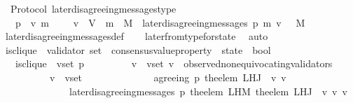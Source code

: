 \begin{isabellebody}
\isanewline
{}\isamarkupfalse%
\ {\isacharparenleft}\ Protocol{\isacharparenright}\ later{\isacharunderscore}disagreeing{\isacharunderscore}messages{\isacharunderscore}type\ {\isacharcolon}\isanewline
\ \ {\isachardoublequoteopen}{\isasymforall}\ p\ {\isasymsigma}\ v\ m{\isachardot}\ {\isasymsigma}\ {\isasymin}\ {\isasymSigma}\ {\isasymand}\ v\ {\isasymin}\ V\ {\isasymand}\ m\ {\isasymin}\ M\ {\isasymlongrightarrow}\ later{\isacharunderscore}disagreeing{\isacharunderscore}messages\ {\isacharparenleft}p{\isacharcomma}\ m{\isacharcomma}\ v{\isacharcomma}\ {\isasymsigma}{\isacharparenright}\ {\isasymsubseteq}\ M{\isachardoublequoteclose}\isanewline
%
\isadelimproof
\ \ %
\endisadelimproof
%
\isatagproof
{}\isamarkupfalse%
\ later{\isacharunderscore}disagreeing{\isacharunderscore}messages{\isacharunderscore}def\isanewline
\ \ \isamarkupfalse%
\ later{\isacharunderscore}from{\isacharunderscore}type{\isacharunderscore}for{\isacharunderscore}state\ \isamarkupfalse%
\ auto%
\endisatagproof
{\isafoldproof}%
%
\isadelimproof
\isanewline
%
\endisadelimproof
\isanewline
\isanewline
\isanewline
\isanewline
\isanewline
\isanewline
\isanewline
\isanewline
{}\isamarkupfalse%
\ is{\isacharunderscore}clique\ {\isacharcolon}{\isacharcolon}\ {\isachardoublequoteopen}{\isacharparenleft}validator\ set\ {\isacharasterisk}\ consensus{\isacharunderscore}value{\isacharunderscore}property\ {\isacharasterisk}\ state{\isacharparenright}\ {\isasymRightarrow}\ bool{\isachardoublequoteclose}\isanewline
\ \isanewline
\ \ \ {\isachardoublequoteopen}is{\isacharunderscore}clique\ {\isacharequal}\ {\isacharparenleft}{\isasymlambda}{\isacharparenleft}v{\isacharunderscore}set{\isacharcomma}\ p{\isacharcomma}\ {\isasymsigma}{\isacharparenright}{\isachardot}\ \isanewline
\ \ \ \ \ \ {\isacharparenleft}{\isasymforall}\ v\ {\isasymin}\ v{\isacharunderscore}set{\isachardot}\ v\ {\isasymin}\ observed{\isacharunderscore}non{\isacharunderscore}equivocating{\isacharunderscore}validators\ {\isasymsigma}\ \ \isanewline
\ \ \ \ \ \ \ {\isasymand}\ {\isacharparenleft}{\isasymforall}\ \ v{\isacharprime}\ {\isasymin}\ v{\isacharunderscore}set{\isachardot}\ \isanewline
\ \ \ \ \ \ \ \ \ \ \ \ \ agreeing\ {\isacharparenleft}p{\isacharcomma}\ {\isacharparenleft}the{\isacharunderscore}elem\ {\isacharparenleft}L{\isacharunderscore}H{\isacharunderscore}J\ {\isasymsigma}\ v{\isacharparenright}{\isacharparenright}{\isacharcomma}\ v{\isacharprime}{\isacharparenright}\isanewline
\ \ \ \ \ \ \ \ \ \ \ \ \ {\isasymand}\ later{\isacharunderscore}disagreeing{\isacharunderscore}messages\ {\isacharparenleft}p{\isacharcomma}\ the{\isacharunderscore}elem\ {\isacharparenleft}L{\isacharunderscore}H{\isacharunderscore}M\ {\isacharparenleft}the{\isacharunderscore}elem\ {\isacharparenleft}L{\isacharunderscore}H{\isacharunderscore}J\ {\isasymsigma}\ v{\isacharparenright}{\isacharparenright}\ v{\isacharprime}{\isacharparenright}{\isacharcomma}\ v{\isacharprime}{\isacharcomma}\ {\isasymsigma}{\isacharparenright}\ {\isacharequal}\ {\isasymemptyset}{\isacharparenright}{\isacharparenright}{\isacharparenright}{\isachardoublequoteclose}\isanewline

\end{isabellebody}
